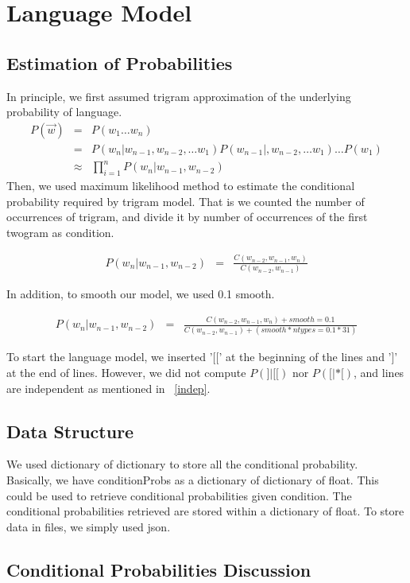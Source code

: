 \documentclass{article}
\begin{document}
\section{Language Model}

\subsection{Estimation of Probabilities}
In principle, we first assumed trigram approximation of the underlying probability of language.
\begin{eqnarray*}
	P(\vec{w}) &=& P(w_1\dots w_n)  \\
	&=& P(w_n|w_{n-1},w_{n-2},\dots w_1)P(w_{n-1}|,w_{n-2},\dots w_1)\dots P(w_1)  \\
		&\approx& {\prod_{i=1}^{n} P(w_n|w_{n-1},w_{n-2}) }
\end{eqnarray*}
Then, we used maximum likelihood method to estimate the conditional probability required by trigram model. That is we counted the number of occurrences of trigram, and divide it by number of occurrences of the first twogram as condition. 

\begin{eqnarray*}
	P(w_n|w_{n-1},w_{n-2}) &=& \frac{C(w_{n-2},w_{n-1},w_n)}{C(w_{n-2},w_{n-1})}
\end{eqnarray*}

In addition, to smooth our model, we used 0.1 smooth.

\begin{eqnarray*}
	P(w_n|w_{n-1},w_{n-2}) &=& \frac{C(w_{n-2},w_{n-1},w_n)+smooth=0.1}{C(w_{n-2},w_{n-1})+(smooth*ntypes = 0.1*31)}
\end{eqnarray*}

To start the language model, we inserted '[[' at the beginning of the lines and ']' at the end of lines. However, we did not compute $P(]|[[)$ nor  $P([|*[)$, and lines are independent as mentioned in ~\ref{indep}.

\subsection{Data Structure}
We used dictionary of dictionary to store all the conditional probability. Basically, we have conditionProbs as a dictionary of dictionary of float. This could be used to retrieve conditional probabilities given condition. The conditional probabilities retrieved are stored within a dictionary of float. To store data in files, we simply used json.
\subsection{Conditional Probabilities Discussion}
\end{document}
